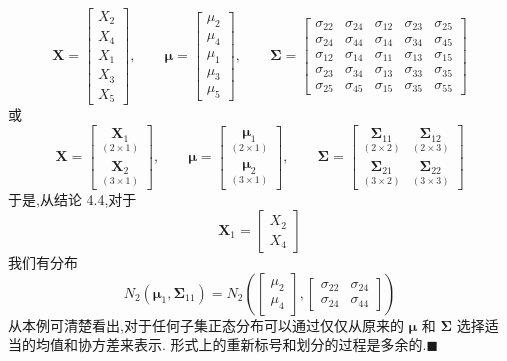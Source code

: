 \[
\mathbf{X}=\begin{bmatrix}X_2\\X_4\\X_1\\X_3\\X_5\end{bmatrix},\qquad
\boldsymbol{\mu}=\begin{bmatrix}\mu_2\\\mu_4\\\mu_1\\\mu_3\\\mu_5\end{bmatrix},\qquad
\boldsymbol{\Sigma}=\begin{bmatrix}\sigma_{22}&\sigma_{24}&\sigma_{12}&\sigma_{23}&\sigma_{25}\\\sigma_{24}&\sigma_{44}&\sigma_{14}&\sigma_{34}&\sigma_{45}\\\sigma_{12}&\sigma_{14}&\sigma_{11}&\sigma_{13}&\sigma_{15}\\\sigma_{23}&\sigma_{34}&\sigma_{13}&\sigma_{33}&\sigma_{35}\\\sigma_{25}&\sigma_{45}&\sigma_{15}&\sigma_{35}&\sigma_{55}\end{bmatrix}
\]
或
\[
\mathbf{X}=\begin{bmatrix}\underset{(2\times1)}{\mathbf{X}_1}\\[2ex]\underset{(3\times1)}{\mathbf{X}_2}\end{bmatrix},\qquad
\boldsymbol{\mu}=\begin{bmatrix}\underset{(2\times1)}{\boldsymbol{\mu}_1}\\[2ex]\underset{(3\times1)}{\boldsymbol{\mu}_2}\end{bmatrix},\qquad
\boldsymbol{\Sigma}=\begin{bmatrix}\underset{(2\times2)}{\boldsymbol{\Sigma}_{11}}&\underset{(2\times3)}{\boldsymbol{\Sigma}_{12}}\\[2ex]\underset{(3\times2)}{\boldsymbol{\Sigma}_{21}}&\underset{(3\times3)}{\boldsymbol{\Sigma}_{22}}\end{bmatrix}
\]
于是,从结论 4.4,对于
\[
\mathbf{X}_1=\begin{bmatrix}X_2\\X_4\end{bmatrix}
\]
我们有分布
\[
N_2(\boldsymbol{\mu}_1,\boldsymbol{\Sigma}_{11})=N_2\left(\begin{bmatrix}\mu_2\\\mu_4\end{bmatrix},\begin{bmatrix}\sigma_{22}&\sigma_{24}\\\sigma_{24}&\sigma_{44}\end{bmatrix}\right)
\]
从本例可清楚看出,对于任何子集正态分布可以通过仅仅从原来的 $\boldsymbol{\mu}$ 和 $\boldsymbol{\Sigma}$ 选择适当的均值和协方差来表示. 形式上的重新标号和划分的过程是多余的.\hfill$\blacksquare$

